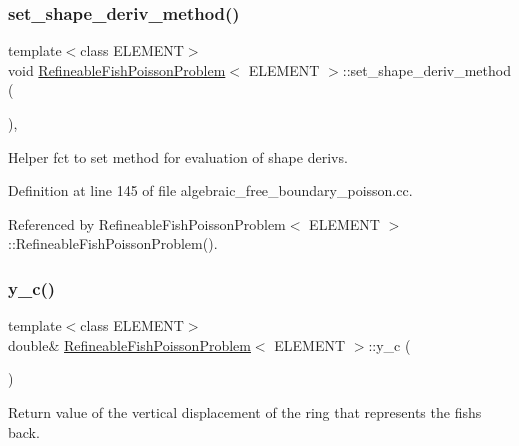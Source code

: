 \subsubsection{\texorpdfstring{set\+\_\+shape\+\_\+deriv\+\_\+method()}{set\_shape\_deriv\_method()}}
{\footnotesize\ttfamily template$<$class E\+L\+E\+M\+E\+NT$>$ \\
void \hyperlink{classRefineableFishPoissonProblem}{Refineable\+Fish\+Poisson\+Problem}$<$ E\+L\+E\+M\+E\+NT $>$\+::set\+\_\+shape\+\_\+deriv\+\_\+method (\begin{DoxyParamCaption}{ }\end{DoxyParamCaption})\hspace{0.3cm}{\ttfamily [inline]}, {\ttfamily [private]}}



Helper fct to set method for evaluation of shape derivs. 



Definition at line 145 of file algebraic\+\_\+free\+\_\+boundary\+\_\+poisson.\+cc.



Referenced by Refineable\+Fish\+Poisson\+Problem$<$ E\+L\+E\+M\+E\+N\+T $>$\+::\+Refineable\+Fish\+Poisson\+Problem().

\mbox{\label{classRefineableFishPoissonProblem_a152227cc825ddea07cb06c2791f5995b}} 
\subsubsection{\texorpdfstring{y\+\_\+c()}{y\_c()}\hspace{0.1cm}{\footnotesize\ttfamily [1/2]}}
{\footnotesize\ttfamily template$<$class E\+L\+E\+M\+E\+NT$>$ \\
double\& \hyperlink{classRefineableFishPoissonProblem}{Refineable\+Fish\+Poisson\+Problem}$<$ E\+L\+E\+M\+E\+NT $>$\+::y\+\_\+c (\begin{DoxyParamCaption}{ }\end{DoxyParamCaption})\hspace{0.3cm}{\ttfamily [inline]}}



Return value of the vertical displacement of the ring that represents the fish\textquotesingle{}s back. 



